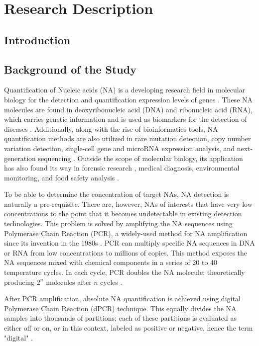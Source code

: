 \chapter{Research Description}
\label{sec:researchdesc} 

\section{Introduction}
\label{sec:introduction}

\section{Background of the Study}
\label{sec:backgroundstudy}

Quantification of Nucleic acids (NA) is a developing research field in molecular biology for the detection and quantification expression levels of genes \cite{Huggett2015}. These NA molecules are found in deoxyribonucleic acid (DNA) and ribonucleic acid (RNA), which carries genetic information and is used as biomarkers for the detection of diseases \cite{Cao2017}. Additionally, along with the rise of bioinformatics tools, NA quantification methods are also utilized in rare mutation detection, copy number variation detection, single-cell gene and microRNA expression analysis, and next-generation sequencing \cite{Quan2018}. Outside the scope of molecular biology, its application has also found its way in forensic research \cite{Whale2013}, medical diagnosis, environmental monitoring, and food safety analysis \cite{Cao2017}.


To be able to determine the concentration of target NAs, NA detection is naturally a pre-requisite. There are, however, NAs of interests that have very low concentrations to the point that it becomes undetectable in existing detection technologies. This problem is solved by amplifying the NA sequences using Polymerase Chain Reaction (PCR), a widely-used method for NA amplification since its invention in the 1980s \cite{Cao2017}. PCR can multiply specific NA sequences in DNA or RNA from low concentrations to millions of copies. This method exposes the NA sequences mixed with chemical components in a series of 20 to 40 temperature cycles. In each cycle, PCR doubles the NA molecule; theoretically producing \(2^n\) molecules after \(n\) cycles \cite{Quan2018}.

After PCR amplification, absolute NA quantification is achieved using digital Polymerase Chain Reaction (dPCR) technique. This equally divides the NA samples into thousands of partitions; each of these partitions is evaluated as either off or on, or in this context, labeled as positive or negative, hence the term "digital" \cite{Cao2017}.

